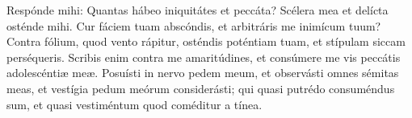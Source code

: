 Respónde mihi:
	Quantas hábeo iniquitátes et peccáta?
	Scélera mea et delícta osténde mihi.
Cur fáciem tuam abscóndis, et arbitráris me inimícum tuum?
Contra fólium, quod vento rápitur, osténdis poténtiam tuam,
	et stípulam siccam perséqueris.
Scribis enim contra me amaritúdines,
	et consúmere me vis peccátis adolescéntiæ meæ.
Posuísti in nervo pedem meum, et observásti omnes sémitas meas,
	et vestígia pedum meórum considerásti;
	qui quasi putrédo consuméndus sum,
	et quasi vestiméntum quod coméditur a tínea.
